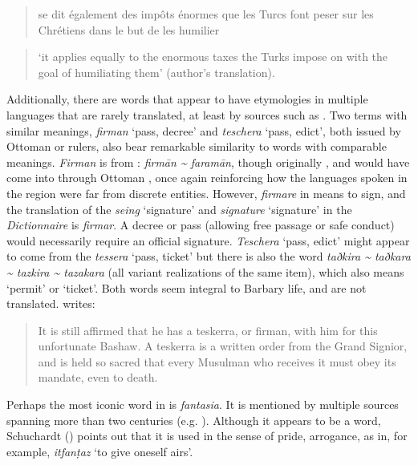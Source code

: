 \documentclass[output=paper]{langsci/langscibook}
\begin{document}
	\begin{quote}
		se dit également des impôts énormes que les Turcs font peser sur les Chrétiens dans le but de les humilier
	\end{quote}
	
	\begin{quote}
		‘it applies equally to the enormous taxes the Turks impose on  with the goal of humiliating them’ (author's translation).
	\end{quote}
	
	Additionally, there are words that appear to have etymologies in multiple languages that are rarely translated, at least by  sources such as \citet{Tully1819}. Two terms with similar meanings, \textit{firman} ‘pass, decree’ and \textit{teschera} ‘pass, edict’, both issued by Ottoman or  rulers, also bear remarkable similarity to  words with comparable meanings. \textit{Firman} is from : \textit{firmān {\textasciitilde} faramān}, though originally , and would have come into  through Ottoman , once again reinforcing how the languages spoken in the region were far from discrete entities. However, \textit{firmare} in  means to sign, and the  translation of the  \textit{seing} ‘signature’ and \textit{signature} ‘signature’ in the \textit{Dictionnaire} is \textit{firmar}. A decree or pass (allowing free passage or safe conduct) would necessarily require an official signature. \textit{Teschera} ‘pass, edict’ might appear to come from the  \textit{tessera} ‘pass, ticket’ but there is also the  word \textit{taðkira {\textasciitilde} taðkara {\textasciitilde} tazkira {\textasciitilde} tazakara} (all variant realizations of the same item), which also means ‘permit’ or ‘ticket’. Both words seem integral to Barbary life, and are not translated. \citet[258]{Tully1819} writes: 
	
	\begin{quote}
		It is still affirmed that he has a teskerra, or firman, with him for this unfortunate Bashaw. A teskerra is a written order from the Grand Signior, and is held so sacred that every Musulman who receives it must obey its mandate, even to death.
	\end{quote}
	
	Perhaps the most iconic word in  is \textit{fantasia}. It is mentioned by multiple sources spanning more than two centuries (e.g. \citealt{Haedo1612,Broughton1839}). Although it appears to be a  word, Schuchardt (\citeyear[71]{Schuchardt1909}) points out that it is used in the  sense of pride, arrogance, as in, for example,   \textit{itfanṭaz} ‘to give oneself airs’.
	
\end{document}
